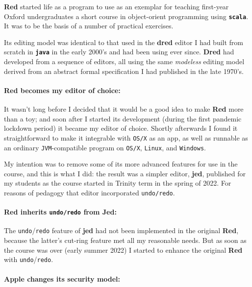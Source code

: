 \documentclass[11pt,a4paper]{article}
\begin{document}
\textbf{Red} started life as a program to use as an exemplar for
teaching first-year Oxford undergraduates a short course in
object-orient programming using \textbf{\texttt{scala}}. It was to be
the basis of a number of practical exercises.

Its editing model was identical to that used in the \textbf{dred} editor
I had built from scratch in \textbf{\texttt{java}} in the early 2000's
and had been using ever since. \textbf{Dred} had developed from a
sequence of editors, all using the same \emph{modeless} editing model
derived from an abstract formal specification I had published in the
late 1970's.

\hypertarget{red-becomes-my-editor-of-choice}{%
\paragraph{Red becomes my editor of
choice:}\label{red-becomes-my-editor-of-choice}}

It wasn't long before I decided that it would be a good idea to make
\textbf{Red} more than a toy; and soon after I started its development
(during the first pandemic lockdown period) it became my editor of
choice. Shortly afterwards I found it straightforward to make it
integrable with \texttt{OS/X} as an app, as well as runnable as an
ordinary \texttt{JVM}-compatible program on \texttt{OS/X},
\texttt{Linux}, and \texttt{Windows}.

My intention was to remove some of its more advanced features for use in
the course, and this is what I did: the result was a simpler editor,
\textbf{jed}, published for my students as the course started in Trinity
term in the spring of 2022. For reasons of pedagogy that editor
incorporated \texttt{undo/redo}.

\hypertarget{red-inherits-undoredo-from-jed}{%
\paragraph{\texorpdfstring{Red inherits \texttt{undo/redo} from
Jed:}{Red inherits undo/redo from Jed:}}\label{red-inherits-undoredo-from-jed}}

The \texttt{undo}/\texttt{redo} feature of \textbf{jed} had not been
implemented in the original \textbf{Red}, because the latter's cut-ring
feature met all my reasonable needs. But as soon as the course was over
(early summer 2022) I started to enhance the original \textbf{Red} with
\texttt{undo}/\texttt{redo}.

\hypertarget{apple-changes-its-security-model}{%
\paragraph{Apple changes its security
model:}\label{apple-changes-its-security-model}}
\end{document}
